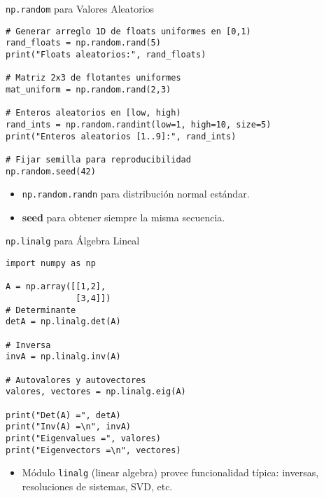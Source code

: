 \documentclass[10pt]{beamer}
\begin{document}
\begin{frame}[fragile]{\texttt{np.random} para Valores Aleatorios}
\begin{verbatim}
# Generar arreglo 1D de floats uniformes en [0,1)
rand_floats = np.random.rand(5)
print("Floats aleatorios:", rand_floats)

# Matriz 2x3 de flotantes uniformes
mat_uniform = np.random.rand(2,3)

# Enteros aleatorios en [low, high)
rand_ints = np.random.randint(low=1, high=10, size=5)
print("Enteros aleatorios [1..9]:", rand_ints)

# Fijar semilla para reproducibilidad
np.random.seed(42)
\end{verbatim}
\begin{itemize}
  \item \texttt{np.random.randn} para distribución normal estándar.
  \item \textbf{seed} para obtener siempre la misma secuencia.
\end{itemize}
\end{frame}

\begin{frame}[fragile]{\texttt{np.linalg} para Álgebra Lineal}
\begin{verbatim}
import numpy as np

A = np.array([[1,2],
              [3,4]])
# Determinante
detA = np.linalg.det(A)

# Inversa
invA = np.linalg.inv(A)

# Autovalores y autovectores
valores, vectores = np.linalg.eig(A)

print("Det(A) =", detA)
print("Inv(A) =\n", invA)
print("Eigenvalues =", valores)
print("Eigenvectors =\n", vectores)
\end{verbatim}
\begin{itemize}
  \item Módulo \texttt{linalg} (linear algebra) provee funcionalidad típica: inversas, resoluciones de sistemas, SVD, etc.
\end{itemize}
\end{frame}
\end{document}

